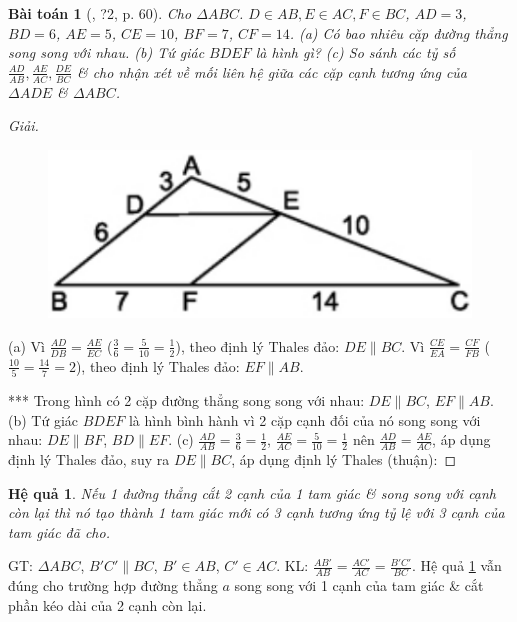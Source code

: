 \documentclass{article}
\newtheorem{baitoan}{Bài toán}
\newtheorem{hequa}{Hệ quả}
\begin{document}
\begin{baitoan}[\cite{SGK_Toan_8_tap_2}, ?2, p. 60]
	Cho $\Delta ABC$. $D\in AB,E\in AC,F\in BC$, $AD = 3$, $BD = 6$, $AE = 5$, $CE = 10$, $BF = 7$, $CF = 14$. (a) Có bao nhiêu cặp đường thẳng song song với nhau. (b) Tứ giác $BDEF$ là hình gì? (c) So sánh các tỷ số $\frac{AD}{AB},\frac{AE}{AC},\frac{DE}{BC}$ \& cho nhận xét về mối liên hệ giữa các cặp cạnh tương ứng của $\Delta ADE$ \& $\Delta ABC$.
\end{baitoan}

\begin{proof}[Giải]
	\begin{figure}[H]
		\centering
		\includegraphics[scale=0.25]{SGK_Toan_8_9}
	\end{figure}
	(a) Vì $\frac{AD}{DB} = \frac{AE}{EC}$ ($\frac{3}{6} = \frac{5}{10} = \frac{1}{2}$), theo định lý Thales đảo: $DE\parallel BC$. Vì $\frac{CE}{EA} = \frac{CF}{FB}$ ($\frac{10}{5} = \frac{14}{7} = 2$), theo định lý Thales đảo: $EF\parallel AB$. 
	
	
	 *** Trong hình có 2 cặp đường thẳng song song với nhau: $DE\parallel BC$, $EF\parallel AB$. (b) Tứ giác $BDEF$ là hình bình hành vì 2 cặp cạnh đối của nó song song với nhau: $DE\parallel BF$, $BD\parallel EF$. (c) $\frac{AD}{AB} = \frac{3}{6} = \frac{1}{2}$, $\frac{AE}{AC} = \frac{5}{10} = \frac{1}{2}$ nên $\frac{AD}{AB} = \frac{AE}{AC}$, áp dụng định lý Thales đảo, suy ra $DE\parallel BC$, áp dụng định lý Thales (thuận): 
\end{proof}

\begin{hequa}
	\label{col: Thales}
	Nếu 1 đường thẳng cắt 2 cạnh của 1 tam giác \& song song với cạnh còn lại thì nó tạo thành 1 tam giác mới có 3 cạnh tương ứng tỷ lệ với 3 cạnh của tam giác đã cho.
\end{hequa}
GT: $\Delta ABC$, $B'C'\parallel BC$, $B'\in AB$, $C'\in AC$. KL: $\frac{AB'}{AB} = \frac{AC'}{AC} = \frac{B'C'}{BC}$. Hệ quả \ref{col: Thales} vẫn đúng cho trường hợp đường thẳng $a$ song song với 1 cạnh của tam giác \& cắt phần kéo dài của 2 cạnh còn lại.
\end{document}
